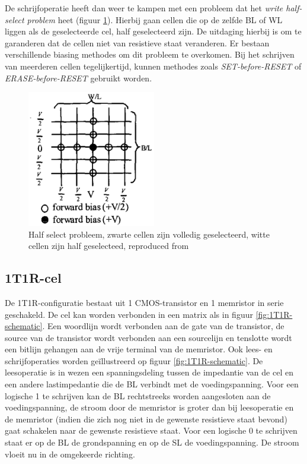 De schrijfoperatie heeft dan weer te kampen met een probleem dat het \textit{write half-select problem} heet (figuur \ref{fig:halfselct}). Hierbij gaan cellen die op de zelfde BL of WL liggen als de geselecteerde cel, half geselecteerd zijn. De uitdaging hierbij is om te garanderen dat de cellen niet van resistieve staat veranderen. Er bestaan verschillende biasing methodes \cite{1269425} om dit probleem te overkomen. Bij het schrijven van meerderen cellen tegelijkertijd, kunnen methodes zoals \textit{SET-before-RESET} of \textit{ERASE-before-RESET}\cite{5763125} gebruikt worden.

\begin{figure}
  \centering
  \includegraphics[width=0.5\textwidth]{../fig/hfdstk-cel-halfselect.png}
  \caption[Half select problem]{Half select probleem, zwarte cellen zijn volledig geselecteerd, witte cellen zijn half geselecteed, reproduced from\cite{leakpath}}
  \label{fig:halfselct}
\end{figure}

\subsection{1T1R-cel}
\label{1T1R}
De 1T1R-configuratie bestaat uit 1 CMOS-transistor en 1 memristor in serie geschakeld. De cel kan  worden verbonden in een matrix als in figuur \ref{fig:1T1R-schematic}. Een woordlijn wordt verbonden aan de gate van de transistor, de source van de transistor wordt verbonden aan een sourcelijn en tenslotte wordt een bitlijn gehangen aan de vrije terminal van de memristor. Ook lees- en schrijfoperaties worden geïllustreerd op figuur \ref{fig:1T1R-schematic}. De leesoperatie is in wezen een spanningsdeling tussen de impedantie van de cel en een andere lastimpedantie die de BL verbindt met de voedingspanning. Voor een logische 1 te schrijven kan de BL rechtstreeks worden aangesloten aan de voedingspanning, de stroom door de memristor is groter dan bij leesoperatie en de memristor (indien die zich nog niet in de gewenste resistieve staat bevond) gaat schakelen naar de gewenste resistieve staat. Voor een logische 0 te schrijven staat er op de BL de grondspanning en op de SL de voedingspanning. De stroom vloeit nu in de omgekeerde richting.

